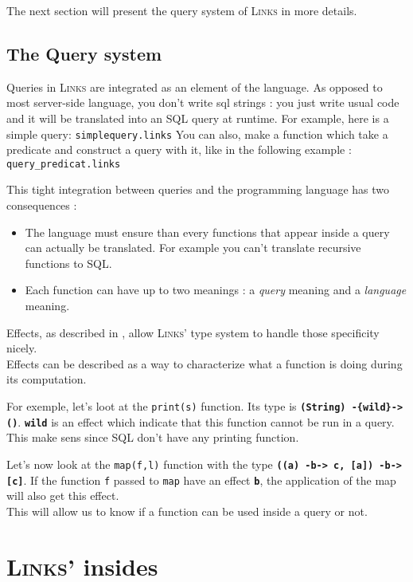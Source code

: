 \documentclass[11pt]{article}
\newcommand\mysc[1]{{\rmfamily\textsc{#1}}\xspace}
\newcommand\links{\mysc{Links}}
\newcommand\sql{\mysc{SQL}}
\newcommand\sig[1]{{\tt\bf #1}}
\newcommand\code[1]{{\tt #1}}
\newcommand\linkslst[1]{{\tt #1}}
\newcommand\effect[1]{{\em #1}}
\begin{document}
The next section will present the query system of \links in more details.

\subsection{The Query system\label{intro:query}}

Queries in \links are integrated as an element of the language. As opposed to most server-side language, you don't write sql strings : you just write usual code and it will be translated into an \sql query at runtime.
For example, here is a simple query: \linkslst{simplequery.links}
You can also, make a function which take a predicate and construct a query with it, like in the following example : \linkslst{query_predicat.links}


This tight integration between queries and the programming language has two consequences :
\begin{itemize}
\item The language must ensure than every functions that appear inside a query can actually be translated. For example you can't translate recursive functions to \sql.
\item Each function can have up to two meanings : a \effect{query} meaning and a \effect{language} meaning.
\end{itemize}

Effects, as described in \cite{links:effect}, allow \links' type system to handle those specificity nicely.\\

Effects can be described as a way to characterize what a function is doing during its computation. 

For exemple, let's loot at the \code{print(s)} function. Its type is \sig{(String) -\{wild\}-> ()}. \sig{wild} is an effect which indicate that this function cannot be run in a query. This make sens since \sql don't have any printing function.

Let's now look at the \code{map(f,l)} function with the type \sig{((a) -b-> c, [a]) -b-> [c]}. If the function \code{f} passed to \code{map} have an effect \sig{b}, the application of the map will also get this effect.\\

This will allow us to know if a function can be used inside a query or not.

\section{\links' insides}
\end{document}
